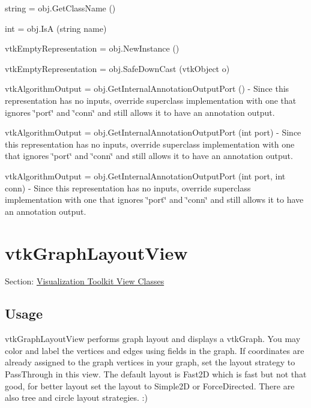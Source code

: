 \begin{DoxyItemize}
\item {\ttfamily string = obj.\-Get\-Class\-Name ()}  
\item {\ttfamily int = obj.\-Is\-A (string name)}  
\item {\ttfamily vtk\-Empty\-Representation = obj.\-New\-Instance ()}  
\item {\ttfamily vtk\-Empty\-Representation = obj.\-Safe\-Down\-Cast (vtk\-Object o)}  
\item {\ttfamily vtk\-Algorithm\-Output = obj.\-Get\-Internal\-Annotation\-Output\-Port ()} -\/ Since this representation has no inputs, override superclass implementation with one that ignores \char`\"{}port\char`\"{} and \char`\"{}conn\char`\"{} and still allows it to have an annotation output.  
\item {\ttfamily vtk\-Algorithm\-Output = obj.\-Get\-Internal\-Annotation\-Output\-Port (int port)} -\/ Since this representation has no inputs, override superclass implementation with one that ignores \char`\"{}port\char`\"{} and \char`\"{}conn\char`\"{} and still allows it to have an annotation output.  
\item {\ttfamily vtk\-Algorithm\-Output = obj.\-Get\-Internal\-Annotation\-Output\-Port (int port, int conn)} -\/ Since this representation has no inputs, override superclass implementation with one that ignores \char`\"{}port\char`\"{} and \char`\"{}conn\char`\"{} and still allows it to have an annotation output.  
\end{DoxyItemize}\hypertarget{vtkviews_vtkgraphlayoutview}{}\section{vtk\-Graph\-Layout\-View}\label{vtkviews_vtkgraphlayoutview}
Section\-: \hyperlink{sec_vtkviews}{Visualization Toolkit View Classes} \hypertarget{vtkwidgets_vtkxyplotwidget_Usage}{}\subsection{Usage}\label{vtkwidgets_vtkxyplotwidget_Usage}
vtk\-Graph\-Layout\-View performs graph layout and displays a vtk\-Graph. You may color and label the vertices and edges using fields in the graph. If coordinates are already assigned to the graph vertices in your graph, set the layout strategy to Pass\-Through in this view. The default layout is Fast2\-D which is fast but not that good, for better layout set the layout to Simple2\-D or Force\-Directed. There are also tree and circle layout strategies. \-:)

